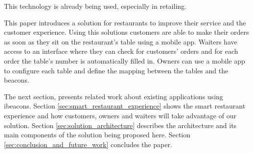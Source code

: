 This technology is already being used, especially in retailing.

This paper introduces a solution for restaurants to improve their
service and the customer experience. Using this solutions customers
are able to make their orders as soon as they sit on
the restaurant's table using a mobile app.
Waiters have access to an interface where they can check for customers'
orders and for each order the table's number is automatically filled in.
Owners can use a mobile app to configure each table and define the
mapping between the tables
and the beacons.

The next section, presents related work about existing applications using ibeacons.
Section \ref{sec:smart_restaurant_experience} shows the smart restaurant
experience and how customers, owners and waiters will take advantage of our
solution. Section \ref{sec:solution_architecture} describes the architecture
and its main components
of the solution being proposed here.
Section \ref{sec:conclusion_and_future_work} concludes the paper.
